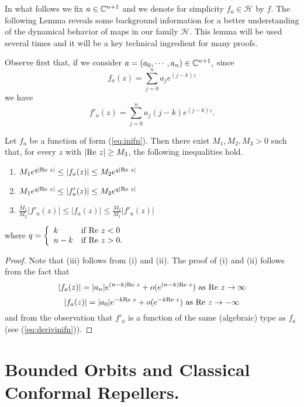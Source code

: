 In what follows we fix $a\in {\mathbb C}^{n+1}$ and we denote for simplicity $f_a
\in \mathcal{H}$ by $f$.  The following Lemma reveals some background
information for a better understanding of the dynamical behavior of maps in
our family $\mathcal{H}.$ This lemma will be used several times and it will
be a key technical ingredient for many proofs.

Observe first that, if we consider $a=(a_0, \cdots, a_n)\in {\mathbb C}^{n+1},$
since
\begin{equation}
  \label{eq:inifn}
  f_a(z)=\sum_{j=0}^{n}a_je^{(j-k)z}
\end{equation}
we have
\begin{equation}
  \label{eq:derivinifn}
  f'_a(z)=\sum_{j=0}^n a_j(j-k) e^{(j-k)z}.
\end{equation}

\begin{lemma}\label{lem:M123}
  Let $f_a$ be a function of form (\ref{eq:inifn}).  Then there exist $M_1,
  M_2, M_3>0$ such that, for every $z$ with $|\textrm{Re } z|\geq M_3$, the following
  inequalities hold.
  \begin{enumerate}
  \item $M_1e^{q|\textrm{Re } z|}\leq |f_a(z)|\leq M_2e^{q|\textrm{Re } z|}$
  \item $M_1e^{q|\textrm{Re } z|}\leq |f'_a(z)|\leq M_2e^{q|\textrm{Re } z|}$
  \item $\frac{M_1}{M_2}|f'_a(z)|\leq |f_a(z)|\leq \frac{
      M_2}{M_1}|f'_a(z)|$
  \end{enumerate}
  where $q=\left\{ \begin{array}{ll} k & \textrm{if } \textrm{Re } z< 0\\ n-k &
      \textrm{if } \textrm{Re } z>0. \end{array}\right.$
\end{lemma} 

\begin{proof}
  Note that (iii) follows from (i) and (ii). The proof of (i) and (ii)
  follows from the fact that
  \[
  |f_a(z)|=|a_n|e^{(n-k)\textrm{Re } z} +o(e^{(n-k)\textrm{Re } z}) \textrm{ as } \textrm{Re }
  z \rightarrow\infty
  \]
  \[
  |f_a(z)|=|a_0|e^{-k\textrm{Re } z}+o(e^{-k\textrm{Re } z})\textrm{ as } \textrm{Re }
  z\rightarrow-\infty
  \]
  and from the observation that $f'_a$ is a function of the same (algebraic)
  type as $f_a$ (see (\ref{eq:derivinifn})).
\end{proof}


\section{Bounded Orbits and Classical Conformal Repellers.}

